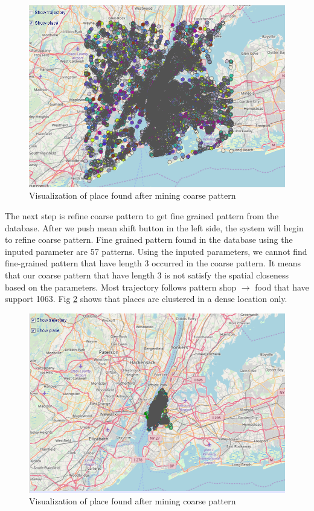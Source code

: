 \documentclass[conference]{IEEEtran}
\begin{document}
\begin{figure}[h!]
	\centering
	\includegraphics[width=1\linewidth]{mapCoarse}
	\caption{Visualization of place found after mining coarse pattern}
	\label{fig:mapcoarse}
\end{figure}

The next step is refine coarse pattern to get fine grained pattern from the database. After we push mean shift button in the left side, the system will begin to refine coarse pattern. Fine grained pattern found in the database using the inputed parameter are 57 patterns. Using the inputed parameters, we cannot find fine-grained pattern that have length 3 occurred in the coarse pattern. It means that our coarse pattern that have length 3 is not satisfy the spatial closeness based on the parameters. Most trajectory follows pattern shop $\rightarrow$ food that have support 1063. Fig \ref{fig:maprefine} shows that places are clustered in a dense location only.    
\begin{figure}[h!]
	\centering
	\includegraphics[width=1\linewidth]{mapRefine}
	\caption{Visualization of place found after mining coarse pattern}
	\label{fig:maprefine}
\end{figure}
\end{document}

